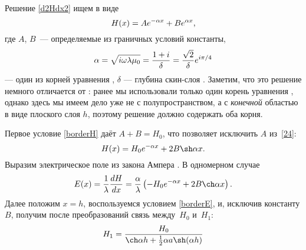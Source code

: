 Решение \eqref{d2Hdx2} ищем в виде 
\begin{equation} \eqmark{24}
H(x)=A e^{-\alpha x}+ B e^{\alpha x},
\end{equation}
где $A$, $B$~--- определяемые из граничных условий константы, 
\begin{equation}\eqmark{alpha}
\alpha=\sqrt{i\omega \lambda \mu_0}=\frac{1+i}{\delta} = 
\frac{\sqrt{2}}{\delta} e^{i\pi/4}
\end{equation} --- один из корней уравнения ,
$\delta$ --- глубина скин-слоя .
Заметим, что это решение немного отличается от : ранее мы использовали только 
один корень уравнения , однако здесь мы имеем дело уже не с 
полупространством, а с \emph{конечной} областью в виде плоского слоя $h$, 
поэтому решение должно содержать оба корня.

Первое условие \eqref{borderH} даёт $A+B = H_0$, что 
позволяет исключить $A$ из~\eqref{24}:
\[
H(x) = H_0 e^{-\alpha x} + 2B \sh \alpha x.
\]
Выразим электрическое поле из закона Ампера .
В одномерном случае
\[
E(x) = \frac{1}{\lambda} \frac{dH}{dx} = 
\frac{\alpha}{\lambda}\left(-H_0 e^{-\alpha x}+ 2B \ch \alpha x\right).
\]
Далее положим $x=h$, воспользуемся условием \eqref{borderE},
и, исключив константу $B$, получим после преобразований связь
между~$H_0$ и~$H_1$:
\begin{equation}\eqmark{H0H1}
H_1 = \frac{H_0}{\ch \alpha h + \frac12 \alpha a \sh (\alpha h)}
\end{equation}

